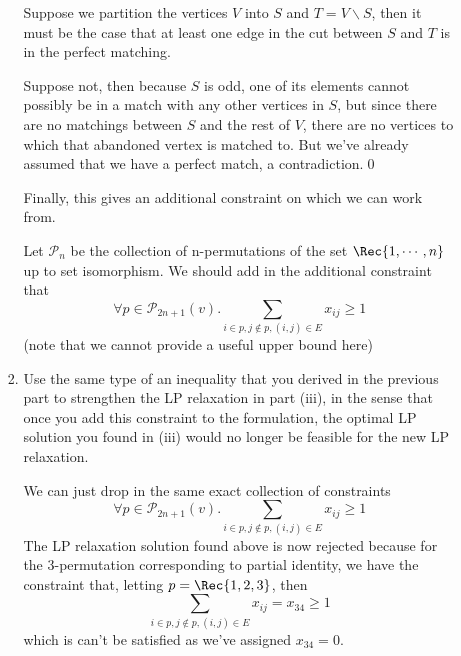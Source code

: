 \documentclass[12pt,a4paper,svgnames]{article}
\begin{document}
\begin{enumerate}[label=\textbf{Exercise \arabic*\ }]
\begin{enumerate}
\begin{enumerate}
\vspace{4mm}
Suppose we partition the vertices $V$ into $S$ and $T = V\backslash S$, then it must be the case that at least one edge in the cut between $S$ and $T$ is in the perfect matching.

Suppose not, then because $S$ is odd, one of its elements cannot possibly be in a match with any other vertices in $S$, but since there are no matchings between $S$ and the rest of $V$, there are no vertices to which that abandoned vertex is matched to. But we've already assumed that we have a perfect match, a contradiction.\hfill\qed

Finally, this gives an additional constraint on which we can work from.

Let $\mathcal{P}_n$ be the collection of n-permutations of the set $\Rec{1,\cdots,n}$ up to set isomorphism. We should add in the additional constraint that
$$
\forall p \in \mathcal{P}_{2n+1}(v). \sum_{i \in p, j \notin p, (i,j) \in E} x_{ij} \ge 1
$$
(note that we cannot provide a useful upper bound here)

\item Use the same type of an inequality that you derived in the previous part to strengthen
the LP relaxation in part (iii), in the sense that once you add this constraint to the formulation, the optimal LP solution you found in (iii) would no longer be feasible for the new LP
relaxation.

\vspace{4mm}
We can just drop in the same exact collection of constraints
$$
\forall p \in \mathcal{P}_{2n+1}(v). \sum_{i \in p, j \notin p,(i,j) \in E} x_{ij} \ge 1
$$
The LP relaxation solution found above is now rejected because for the 3-permutation corresponding to partial identity, we have the constraint that, letting $p = \Rec{1,2,3}$, then
$$
\sum_{i \in p, j \notin p, (i,j) \in E} x_{ij} = x_{34} \ge 1
$$
which is can't be satisfied as we've assigned $x_{34} = 0$.
\end{enumerate}
\end{enumerate}

\end{enumerate}
\end{document}
